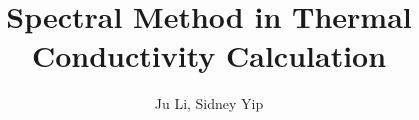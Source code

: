 %
%
%
%
%
%
%
%
%
%

\def\btt#1{{\tt$\backslash$#1}}

\newcommand{\PSbox}[3]
{\begin{center}\mbox{\special{psfile=#1}\hspace{#2}\rule{0pt}{#3}}\end{center}}
\newcommand{\psA}[1]{\PSbox{#1 hoffset=-40 voffset=-15 hscale=45 vscale=45}
{7.5cm}{17cm}}
\newcommand{\psB}[1]{\PSbox{#1 hoffset=-98 voffset=-200 hscale=100 vscale=100}
{15cm}{18cm}}


\draft
 
\title{Spectral Method in Thermal Conductivity Calculation}
\author{Ju Li, Sidney Yip}

\address{Department of Nuclear Engineering \\
Massachusetts Institute of Technology, Cambridge, MA 02139-4307}

